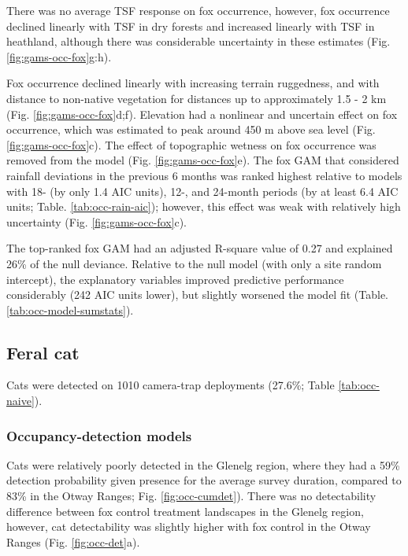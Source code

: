 \documentclass[11pt,a4paper,titlepage,twoside,openright]{style/unimelbthesis}
\begin{document}
\begin{mainmatter}
There was no average TSF response on fox occurrence, however, fox occurrence declined linearly with TSF in dry forests and increased linearly with TSF in heathland, although there was considerable uncertainty in these estimates (Fig. \ref{fig:gams-occ-fox}g:h).

Fox occurrence declined linearly with increasing terrain ruggedness, and with distance to non-native vegetation for distances up to approximately 1.5 - 2 km (Fig. \ref{fig:gams-occ-fox}d;f). Elevation had a nonlinear and uncertain effect on fox occurrence, which was estimated to peak around 450 m above sea level (Fig. \ref{fig:gams-occ-fox}c). The effect of topographic wetness on fox occurrence was removed from the model (Fig. \ref{fig:gams-occ-fox}e). The fox GAM that considered rainfall deviations in the previous 6 months was ranked highest relative to models with 18- (by only 1.4 AIC units), 12-, and 24-month periods (by at least 6.4 AIC units; Table. \ref{tab:occ-rain-aic}); however, this effect was weak with relatively high uncertainty (Fig. \ref{fig:gams-occ-fox}c).

The top-ranked fox GAM had an adjusted R-square value of 0.27 and explained 26\% of the null deviance. Relative to the null model (with only a site random intercept), the explanatory variables improved predictive performance considerably (242 AIC units lower), but slightly worsened the model fit (Table. \ref{tab:occ-model-sumstats}).

\hypertarget{feral-cat-1}{%
\subsection{Feral cat}\label{feral-cat-1}}

Cats were detected on 1010 camera-trap deployments (27.6\%; Table \ref{tab:occ-naive}).

\hypertarget{occupancy-detection-models-2}{%
\subsubsection{Occupancy-detection models}\label{occupancy-detection-models-2}}

Cats were relatively poorly detected in the Glenelg region, where they had a 59\% detection probability given presence for the average survey duration, compared to 83\% in the Otway Ranges; Fig. \ref{fig:occ-cumdet}). There was no detectability difference between fox control treatment landscapes in the Glenelg region, however, cat detectability was slightly higher with fox control in the Otway Ranges (Fig. \ref{fig:occ-det}a).


\end{mainmatter}
\end{document}

